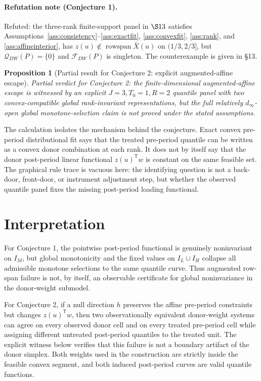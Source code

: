 \documentclass[11pt]{article}
\newcommand{\transpose}{\mathsf{T}}
\theoremstyle{definition}
\theoremstyle{plain}
\newtheorem{proposition}{Proposition}
\theoremstyle{remark}
\begin{document}
\paragraph{Refutation note (Conjecture 1).}
Refuted: the three-rank finite-support panel in \(\S13\) satisfies Assumptions~\ref{ass:consistency}--\ref{ass:exactfit}, \ref{ass:convexfit}, \ref{ass:rank}, and \ref{ass:affineinterior}, has \(z(u)\notin\operatorname{rowspan}\bar X(u)\) on \((1/3,2/3]\), but \(\mathcal{Q}_{DW}(P)=\{0\}\) and \(\mathcal{F}_{DW}(P)\) is singleton.  The counterexample is given in \S13.

\begin{proposition}[Partial result for Conjecture 2: explicit augmented-affine escape]\label{prop:escape-partial}
Partial verdict for Conjecture 2: the finite-dimensional augmented-affine escape is witnessed by an explicit \(J=3,T_0=1,R=2\) quantile panel with two convex-compatible global rank-invariant representations, but the full relatively \(d_\infty\)-open global monotone-selection claim is not proved under the stated assumptions.
\end{proposition}

The calculation isolates the mechanism behind the conjecture.  Exact convex pre-period distributional fit says that the treated pre-period quantile can be written as a convex donor combination at each rank.  It does not by itself say that the donor post-period linear functional \(z(u)^\transpose w\) is constant on the same feasible set.  The graphical rule trace is vacuous here: the identifying question is not a back-door, front-door, or instrument adjustment step, but whether the observed quantile panel fixes the missing post-period loading functional.

\section{Interpretation}
For Conjecture 1, the pointwise post-period functional is genuinely noninvariant on \(I_M\), but global monotonicity and the fixed values on \(I_L\cup I_H\) collapse all admissible monotone selections to the same quantile curve.  Thus augmented row-span failure is not, by itself, an observable certificate for global noninvariance in the donor-weight submodel.

For Conjecture 2, if a null direction \(h\) preserves the affine pre-period constraints but changes \(z(u)^\transpose w\), then two observationally equivalent donor-weight systems can agree on every observed donor cell and on every treated pre-period cell while assigning different untreated post-period quantiles to the treated unit.  The explicit witness below verifies that this failure is not a boundary artifact of the donor simplex.  Both weights used in the construction are strictly inside the feasible convex segment, and both induced post-period curves are valid quantile functions.
\end{document}
